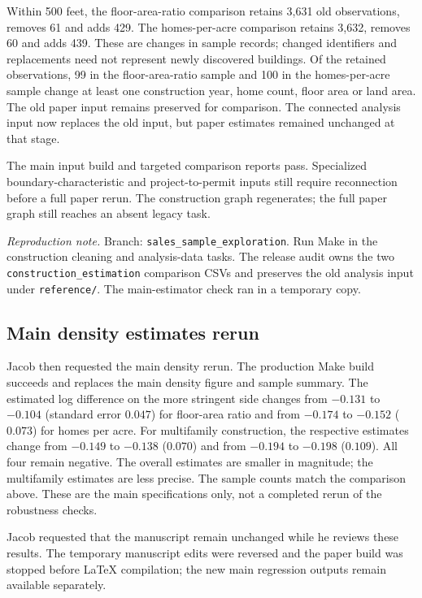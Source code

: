 Within 500 feet, the floor-area-ratio comparison retains 3,631 old observations, removes 61 and adds 429. The homes-per-acre comparison retains 3,632, removes 60 and adds 439. These are changes in sample records; changed identifiers and replacements need not represent newly discovered buildings. Of the retained observations, 99 in the floor-area-ratio sample and 100 in the homes-per-acre sample change at least one construction year, home count, floor area or land area. The old paper input remains preserved for comparison. The connected analysis input now replaces the old input, but paper estimates remained unchanged at that stage.

The main input build and targeted comparison reports pass. Specialized boundary-characteristic and project-to-permit inputs still require reconnection before a full paper rerun. The construction graph regenerates; the full paper graph still reaches an absent legacy task.

\textit{Reproduction note.} Branch: \texttt{sales\_sample\_exploration}. Run Make in the construction cleaning and analysis-data tasks. The release audit owns the two \texttt{construction\_estimation} comparison CSVs and preserves the old analysis input under \texttt{reference/}. The main-estimator check ran in a temporary copy.

\subsection*{Main density estimates rerun}
Jacob then requested the main density rerun. The production Make build succeeds and replaces the main density figure and sample summary. The estimated log difference on the more stringent side changes from $-0.131$ to $-0.104$ (standard error $0.047$) for floor-area ratio and from $-0.174$ to $-0.152$ ($0.073$) for homes per acre. For multifamily construction, the respective estimates change from $-0.149$ to $-0.138$ ($0.070$) and from $-0.194$ to $-0.198$ ($0.109$). All four remain negative. The overall estimates are smaller in magnitude; the multifamily estimates are less precise. The sample counts match the comparison above. These are the main specifications only, not a completed rerun of the robustness checks.

Jacob requested that the manuscript remain unchanged while he reviews these results. The temporary manuscript edits were reversed and the paper build was stopped before LaTeX compilation; the new main regression outputs remain available separately.


